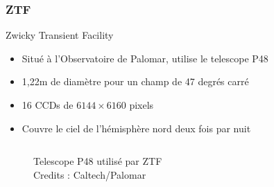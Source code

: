 \documentclass{beamer}
\newcommand{\credits}[1]{\tiny Credits : #1}
\begin{document}
\subsubsection{ZTF}
\begin{frame}{Zwicky Transient Facility}
\begin{itemize}
	\item Situé à l'Observatoire de Palomar, utilise le telescope P48
	\item 1,22m de diamètre pour un champ de 47 degrés carré
	\item 16 CCDs de $6144 \times 6160$ pixels
	\item Couvre le ciel de l'hémisphère nord deux fois par nuit
\end{itemize}
\begin{columns}
	\begin{column}{.55\textwidth}
	\begin{figure}
		\centering
		\caption{Telescope P48 utilisé par ZTF \\ \credits{Caltech/Palomar}}
	\end{figure}
	\end{column}
	

\end{columns}
\end{frame}
\end{document}
